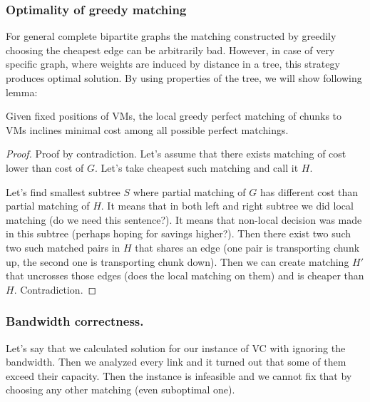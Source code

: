 \subsubsection{Optimality of greedy matching}

For general complete bipartite graphs the matching constructed by greedily choosing the cheapest edge can be arbitrarily bad.
However, in case of very specific graph, where weights are induced by distance in a tree, this strategy produces optimal solution.
By using properties of the tree, we will show following lemma:

\begin{lemma}
  Given fixed positions of VMs, the local greedy perfect matching of chunks to VMs inclines minimal cost among all possible perfect matchings.
\end{lemma}

\begin{proof}
Proof by contradiction. Let's assume that there exists matching of cost lower than cost of $G$. Let's take cheapest such matching and call it $H$.

Let's find smallest subtree $S$ where partial matching of $G$ has different cost than partial matching of $H$. It means that in both left and right subtree we did local matching (do we need this sentence?). It means that non-local decision was made in this subtree (perhaps hoping for savings higher?). Then there exist two such two such matched pairs in $H$ that shares an edge (one pair is transporting chunk up, the second one is transporting chunk down). Then we can create matching $H'$ that uncrosses those edges (does the local matching on them) and is cheaper than $H$. Contradiction.


\end{proof}


\subsubsection{Bandwidth correctness.}

\begin{lemma}
Let's say that we calculated solution for our instance of VC with ignoring the bandwidth. Then we analyzed every link and it turned out that some of them exceed their capacity. Then the instance is infeasible and we cannot fix that by choosing any other matching (even suboptimal one).
\end{lemma}

